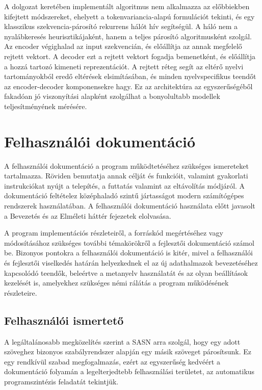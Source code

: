 \documentclass[twoside, 12pt]{report}
\begin{document}

A dolgozat keretében implementált algoritmus nem alkalmazza az előbbiekben kifejtett módszereket, ehelyett a tokenvariancia-alapú formulációt tekinti, és egy klasszikus szekvencia-párosító rekurrens hálót hív segítségül. A háló nem a nyalábkeresés heurisztikájaként, hanem a teljes párosító algoritmusként szolgál. Az encoder végighalad az input szekvencián, és előállítja az annak megfelelő rejtett vektort. A decoder ezt a rejtett vektort fogadja bemenetként, és előállítja a hozzá tartozó kimeneti reprezentációt. A rejtett réteg segít az eltérő nyelvi tartományokból eredő eltérések elsimításában, és minden nyelvspecifikus teendőt az encoder-decoder komponensekre hagy. Ez az architektúra az egyszerűségéből fakadóan jó viszonyítási alapként szolgálhat a bonyolultabb modellek teljesítményének mérésére.

\chapter{Felhasználói dokumentáció}

A felhasználói dokumentáció a program működtetéséhez szükséges ismereteket tartalmazza. Röviden bemutatja annak célját és funkcióit, valamint gyakorlati instrukciókat nyújt a telepítés, a futtatás valamint az eltávolítás módjáról. A dokumentáció feltételez középhaladó szintű jártasságot modern számítógépes rendszerek használatában. A felhasználói dokumentáció használata előtt javasolt a Bevezetés és az Elméleti háttér fejezetek elolvasása.

A program implementációs részleteiről, a forráskód megértéséhez vagy módosításához szükséges további témakörökről a fejlesztői dokumentáció számol be. Bizonyos pontokra a felhasználói dokumentáció is kitér, mivel a felhasználói és fejlesztői viselkedés határán helyezkednek el az új adathalmazok bevezetéséhez kapcsolódó teendők, beleértve a metanyelv használatát és az olyan beállítások kezelését is, amelyekhez szükséges némi rálátás a program működésének részleteire.

\section{Felhasználói ismertető}

A legáltalánosabb megközelítés szerint a SASN arra szolgál, hogy egy adott szöveghez bizonyos szabályrendszer alapján egy másik szöveget párosítsunk. Ez egy rendkívül szabad megfogalmazás, ezért az egyszerűség kedvéért a dokumentáció folyamán a legelterjedtebb felhasználási területet, az automatikus programszintézis feladatát tekintjük.
\end{document}

